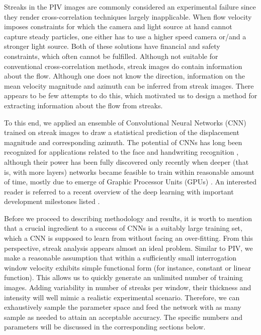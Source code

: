 \documentclass{svjour3}                     %
\begin{document}
Streaks in the PIV images are commonly considered an experimental failure since they render cross-correlation techniques largely inapplicable. When flow velocity imposes constraints for which the camera and light source at hand cannot capture steady particles, one either has to use a higher speed camera or/and a stronger light source. Both of these solutions have financial and safety constraints, which often cannot be fulfilled. Although not suitable for conventional cross-correlation methods, streak images do contain information about the flow. Although one does not know the direction, information on the mean velocity magnitude and azimuth can be inferred from streak images. There appears to be few attempts to do this, which motivated us to design a method for extracting information about the flow from streaks. 

To this end, we applied an ensemble of Convolutional Neural Networks (CNN) trained on streak images to draw a statistical prediction of the displacement magnitude and corresponding azimuth. The potential of CNNs has long been recognized for applications related to the face and handwriting recognition \cite{lawrence1997face, simard2003best}, although their power has been fully discovered only recently when deeper (that is, with more layers) networks became feasible to train within reasonable amount of time, mostly due to emerge of Graphic Processor Units (GPUs) \cite{krizhevsky2012imagenet, karpathy2014large}. An interested reader is referred to a recent overview of the deep learning with important development milestones listed \cite{lecun2015deep}.

Before we proceed to describing methodology and results, it is worth to mention that a crucial ingredient to a success of CNNs is a suitably large training set, which a CNN is supposed to learn from without facing an over-fitting. From this perspective, streak analysis appears almost an ideal problem. Similar to PIV, we make a reasonable assumption that within a sufficiently small interrogation window velocity exhibits simple functional form (for instance, constant or linear function). This allows us to quickly generate an unlimited number of training images. Adding variability in number of streaks per window, their thickness and intensity will well mimic a realistic experimental scenario. Therefore, we can exhaustively sample the parameter space and feed the network with as many sample as needed to attain an acceptable accuracy. The specific numbers and parameters will be discussed in the corresponding sections below.
\end{document}
